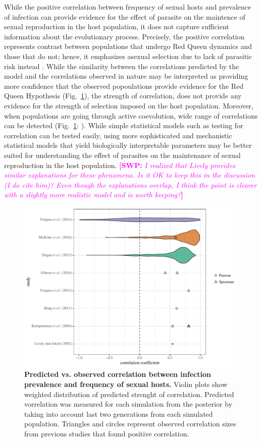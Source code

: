 \documentclass{article}\usepackage[]{graphicx}\usepackage[]{color}
\newcommand{\comment}[3]{\textcolor{#1}{\textbf{[#2: }\textit{#3}\textbf{]}}}
\newcommand{\swp}[1]{\comment{magenta}{SWP}{#1}}
\newcommand{\fref}[1]{Fig.~\ref{fig:#1}}
\begin{document}
While the positive correlation between frequency of sexual hosts and prevalence of infection can provide evidence for the effect of parasite on the maintence of sexual reproduction in the host population, it does not capture sufficient information about the evolutionary process.
Precisely, the positive correlation represents contrast between populations that undergo Red Queen dynamics and those that do not;
hence, it emphasizes asexual selection due to lack of parasitic risk instead \citep{lively2001trematode}.
While the similarity between the correlations predicted by the model and the correlations observed in nature may be interpreted as providing more confidence that the observed popoulations provide evidence for the Red Queen Hypothesis (\fref{effect}), the strength of correlation, does not provide any evidence for the strength of selection imposed on the host population.
Moreover, when populations are going through active coevolution, wide range of correlations can be detected (\fref{effect}: \cite{vergara2014infection}).
While simple statistical models such as testing for correlation can be tested easily,
using more sophisticated and mechanistic statistical models that yield biologically interpretable parameters may be better suited for understanding the effect of parasites on the maintenance of sexual reproduction in the host population.
\swp{I realized that Lively provides similar explanations for these phenomena. Is it OK to keep this in the discussion (I do cite him)? Even though the explanations overlap, I think the point is clearer with a slightly more realistic model and is worth keeping?}

\begin{figure}[!ht]
\includegraphics[width=\textwidth]{../fig/effect_size.pdf}
\caption{{\bf Predicted vs. observed correlation between infection prevalence and frequency of sexual hosts.}
Violin plots show weighted distribution of predicted strenght of correlation.
Predicted vorrelation was measured for each simulation from the posterior by taking into account last two generations from each simulated population.
Triangles and circles represent observed correlation sizes from previous studies that found positive correlation.
}
\label{fig:effect}
\end{figure}
\end{document}
